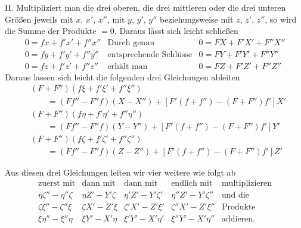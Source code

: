 II. Multipliziert man die drei oberen, die drei mittleren oder die drei unteren Größen jeweils mit $x$, $x'$, $x''$, mit $y$, $y'$, $y''$ beziehungsweise mit $z$, $z'$, $z''$, so wird die Summe der Produkte $=0$. Daraus lässt sich leicht schließen
\[
\begin{array}{r|c|l}
0=fx+f'x'+f''x''&\text{Durch genau}&0=FX+F'X'+F''X''\\
0=fy+f'y'+f''y''&\text{entsprechende Schlüsse}&0=FY+F'Y'+F''Y''\\
0=fz+f'z'+f''z''&\text{erhält man}&0=FZ+F'Z'+F''Z''
\end{array}
\]
%
Daraus lassen sich leicht die folgenden drei Gleichungen ableiten
\[
\begin{aligned}
&(F+F'')(f\xi+f'\xi'+f''\xi'')\\
&\qquad=(Ff''-F''f)(X-X'')+[F'(f+f'')-(F+F'')f']X'\\
&(F+F'')(f\eta+f'\eta'+f''\eta'')\\
&\qquad=(Ff''-F''f)(Y-Y'')+[F'(f+f'')-(F+F'')f']Y'\\
&(F+F'')(f\zeta+f'\zeta'+f''\zeta'')\\
&\qquad=(Ff''-F''f)(Z-Z'')+[F'(f+f'')-(F+F'')f']Z'
\end{aligned}
\]

Aus diesen drei Gleichungen leiten wir vier weitere wie folgt ab
\[
\begin{array}{c|c|c|c|l}
\text{zuerst mit}&\text{dann mit}&\text{dann mit}&\text{endlich mit}&\text{multiplizieren}\\
\eta\zeta''-\eta''\zeta&\eta Z'-Y'\zeta&\eta'Z'-Y'\zeta'&\eta''Z'-Y'\zeta''&\text{und die}\\
\zeta\xi''-\zeta''\xi&\zeta X'-Z'\xi&\zeta'X'-Z'\xi'&\zeta''X'-Z'\xi''&\text{Produkte}\\
\xi\eta''-\xi''\eta&\xi Y'-X'\eta&\xi'Y'-X'\eta'&\xi''Y'-X'\eta''&\text{addieren.}
\end{array}
\]

